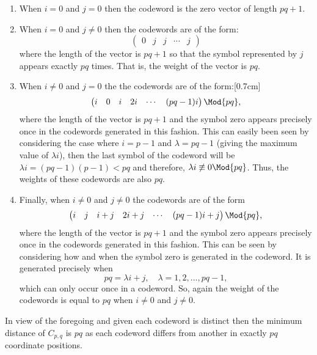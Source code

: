 \begin{enumerate}
\item %
When $i=0$ and $j=0$ then the codeword is the zero vector of length $pq+1$.
\item %
When $i=0$ and $j\not=0$ then the codewords are of the form:
\[
\begin{pmatrix}
0&j&j&\cdots&j
\end{pmatrix}
\]
where the length of the vector is $pq+1$ so that the symbol represented by $j$ appears exactly $pq$ times. That is, the weight of the vector is $pq$.
\item %
When $i\not=0$ and $j=0$ the the codewords are of the form:[0.7cm]
\[
\begin{pmatrix}
i&0&i&2i&\cdots&(pq-1)i
\end{pmatrix}\Mod{pq},
\]
where the length of the vector is $pq+1$ and the symbol zero appears precisely once in the codewords generated in this fashion. This can easily been seen by considering the case where $i=p-1$ and $\lambda = pq-1$ (giving the maximum value of $\lambda i$), then  the last symbol of the codeword will be $\lambda i = (pq-1)(p-1) < pq$ and therefore, $\lambda i \not\equiv 0 \Mod{pq}$. Thus, the weights of these codewords are also $pq$.
\item %
Finally, when $i\not= 0$ and $j\not=0$ the codewords are of the form
\[
\begin{pmatrix}
i&j&i+j&2i+j&\cdots&(pq-1)i + j
\end{pmatrix}\Mod{pq},
\]
where the length of the vector is $pq+1$ and the symbol zero appears precisely once in the codewords generated in this fashion. This can be seen by considering how and when the symbol zero is generated in the codeword. It is generated precisely when 
\[
	pq = \lambda i +j,\quad  \lambda = 1,2,\ldots,pq-1,
\]
which can only occur once in a codeword. So, again the weight of the codewords is equal to $pq$ when $i\not= 0$ and $j\not=0$.
\end{enumerate}
In view of the foregoing and given each codeword is distinct then the minimum distance of $C_{p,q}$ is $pq$ as each codeword differs from another in exactly $pq$ coordinate positions.
